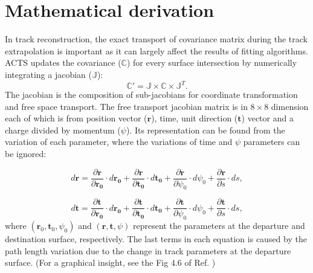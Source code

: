 \documentclass[12pt,a4paper]{scrarticle}
\begin{document}
\maketitle

\begin{abstract}
    
\end{abstract}

\tableofcontents

\section{Mathematical derivation}
In track reconstruction, the exact transport of covariance matrix during the track extrapolation is important as it can largely affect the results of fitting algorithms. ACTS updates the covariance ($\mathbb{C}$) for every surface intersection by numerically integrating a jacobian ($\mathbb{J}$):
\begin{equation}
\mathbb{C}' = \mathbb{J} \times \mathbb{C} \times \mathbb{J}^T.
\end{equation}
The jacobian is the composition of sub-jacobians for coordinate transformation and free space transport. The free transport jacobian matrix is in $8 \times 8$ dimension each of which is from position vector ($\mathbf{r}$), time, unit direction ($\mathbf{t}$) vector and a charge divided by momentum ($\psi$). Its representation can be found from the variation of each parameter, where the variations of time and $\psi$ parameters can be ignored:

\begin{equation}\label{eq:dr}
d\mathbf{r} = 
    \frac{\partial \mathbf{r}}{\partial \mathbf{r_0}} \cdot d\mathbf{r_0} +
    \frac{\partial \mathbf{r}}{\partial \mathbf{t_0}} \cdot d\mathbf{t_0} + 
    \frac{\partial \mathbf{r}}{\partial \psi_0} \cdot d\psi_0 +
    \frac{\partial \mathbf{r}}{\partial s} \cdot ds,
\end{equation}

\begin{equation}
    d\mathbf{t} = 
    \frac{\partial \mathbf{t}}{\partial \mathbf{r_0}} \cdot d\mathbf{r_0} +
    \frac{\partial \mathbf{t}}{\partial \mathbf{t_0}} \cdot d\mathbf{t_0} + 
    \frac{\partial \mathbf{t}}{\partial \psi_0} \cdot d\psi_0 +
    \frac{\partial \mathbf{t}}{\partial s} \cdot ds,
\end{equation}
where $(\mathbf{r}_0, \mathbf{t}_0, \psi_0)$ and $(\mathbf{r}, \mathbf{t}, \psi)$ represent the parameters at the departure and destination surface, respectively. The last terms in each equation is caused by the path length variation due to the change in track parameters at the departure surface. (For a graphical insight, see the Fig 4.6 of Ref. \cite{tracking_book})
\end{document}
